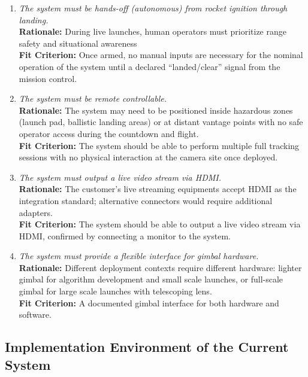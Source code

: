 \documentclass[12pt]{article}
\begin{document}
\begin{enumerate}[label=MD-SL \arabic*., wide=0pt, leftmargin=*]
  \item \emph{The system must be hands-off (autonomous) from rocket ignition through landing.}\\[2mm]
        {\bf Rationale:} During live launches, human operators must prioritize range safety and situational awareness\\
        {\bf Fit Criterion:} Once armed, no manual inputs are necessary for the nominal operation of the system until a declared “landed/clear” signal from the mission control.

  \item \emph{The system must be remote controllable.}\\[2mm]
        {\bf Rationale:} The system may need to be positioned inside hazardous zones (launch pad, ballistic landing areas) or at distant vantage points with no safe operator access during the countdown and flight.\\
        {\bf Fit Criterion:} The system should be able to perform multiple full tracking sessions with no physical interaction at the camera site once deployed.

  \item \emph{The system must output a live video stream via HDMI.}\\[2mm]
        {\bf Rationale:} The customer's live streaming equipments accept HDMI as the integration standard; alternative connectors would require additional adapters.\\
        {\bf Fit Criterion:} The system should be able to output a live video stream via HDMI, confirmed by connecting a monitor to the system.

  \item \emph{The system must provide a flexible interface for gimbal hardware.}\\[2mm]
        {\bf Rationale:} Different deployment contexts require different hardware: lighter gimbal for algorithm development and small scale launches, or full-scale gimbal for large scale launches with telescoping lens.\\
        {\bf Fit Criterion:} A documented gimbal interface for both hardware and software.
\end{enumerate}

\subsection{Implementation Environment of the Current System}
\end{document}

